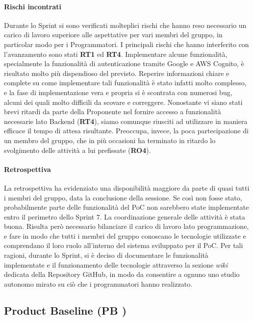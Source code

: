 \documentclass[a4paper,12pt]{article}
\begin{document}
\paragraph{Rischi incontrati}
Durante lo Sprint si sono verificati molteplici rischi che hanno reso necessario un carico di lavoro superiore alle aspettative per vari membri del gruppo, in particolar modo per i Programmatori. I principali rischi che hanno interferito con l'avanzamento sono stati \textbf{RT1} ed \textbf{RT4}. Implementare alcune funzionalità, specialmente la funzionalità di autenticazione tramite Google e AWS Cognito, è risultato molto più dispendioso del previsto. Reperire informazioni chiare e complete su come implementare tali funzionalità è stato infatti molto complesso, e la fase di implementazione vera e propria si è scontrata con numerosi bug, alcuni dei quali molto difficili da scovare e correggere. 
Nonostante vi siano stati brevi ritardi da parte della Proponente nel fornire accesso a funzionalità necessarie lato Backend (\textbf{RT4}), siamo comunque riusciti ad utilizzare in maniera efficace il tempo di attesa risultante. Preoccupa, invece, la poca partecipazione di un membro del gruppo, che in più occasioni ha terminato in ritardo lo svolgimento delle attività a lui prefissate (\textbf{RO4}).
\paragraph{Retrospettiva}
La retrospettiva ha evidenziato una disponibilità maggiore da parte di quasi tutti i membri del gruppo, data la conclusione della sessione. Se così non fosse stato, probabilmente parte delle funzionalità del PoC non sarebbero state implementate entro il perimetro dello Sprint 7. La coordinazione generale delle attività è stata buona. Risulta però necessario bilanciare il carico di lavoro lato programmazione, e fare in modo che tutti i membri del gruppo conoscano le tecnologie utilizzate e comprendano il loro ruolo all'interno del sistema sviluppato per il PoC. Per tali ragioni, durante lo Sprint, si è deciso di documentare le funzionalità implementate e il funzionamento delle tecnologie attraverso la sezione \textit{wiki} dedicata della Repository GitHub, in modo da consentire a ognuno uno studio autonomo mirato su ciò che i programmatori hanno realizzato.


\subsection{Product Baseline (PB )}
\end{document}
